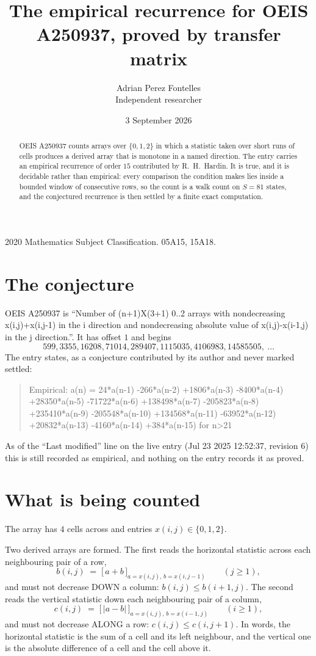 \documentclass[11pt,a4paper]{article}
\title{The empirical recurrence for OEIS A250937, proved by transfer matrix}
\author{Adrian Perez Fontelles\\ \small Independent researcher}
\date{3 September 2026}
\theoremstyle{plain}
\theoremstyle{definition}
\begin{document}
\maketitle

\begin{abstract}
OEIS A250937 counts arrays over $\{0,1,2\}$ in which a statistic taken over short runs
of cells produces a derived array that is monotone in a named direction. The entry carries an
empirical recurrence of order $15$ contributed by R.~H.~Hardin. It is true, and it is
decidable rather than empirical: every comparison the condition makes lies inside a bounded
window of consecutive rows, so the count is a walk count on $S=81$ states, and the
conjectured recurrence is then settled by a finite exact computation.
\end{abstract}

\noindent\small 2020 Mathematics Subject Classification. 05A15, 15A18.\normalsize

\section{The conjecture}

OEIS A250937 is ``Number of (n+1)X(3+1) 0..2 arrays with nondecreasing x(i,j)+x(i,j-1) in the i direction and nondecreasing absolute value of x(i,j)-x(i-1,j) in the j direction.''. It has offset $1$ and begins
\[
599, 3355, 16208, 71014, 289407, 1115035, 4106983, 14585505,\ \dots
\]
The entry states, as a conjecture contributed by its author and never marked settled:
\begin{quote}
Empirical: a(n) = 24*a(n-1) -266*a(n-2) +1806*a(n-3) -8400*a(n-4) +28350*a(n-5) -71722*a(n-6) +138498*a(n-7) -205823*a(n-8) +235410*a(n-9) -205548*a(n-10) +134568*a(n-11) -63952*a(n-12) +20832*a(n-13) -4160*a(n-14) +384*a(n-15) for n>21
\end{quote}
As of the ``Last modified'' line on the live entry (Jul 23 2025 12:52:37, revision 6) this is still
recorded as empirical, and nothing on the entry records it as proved.

\section{What is being counted}

The array has $4$ cells across and entries $x(i,j)\in\{0,1,2\}$.

Two derived arrays are formed. The first reads the horizontal statistic across each
neighbouring pair of a row,
\[
b(i,j)\;=\;\bigl[\,a+b\,\bigr]_{a=x(i,j),\,b=x(i,j-1)}\qquad (j\ge1),
\]
and must not decrease DOWN a column: $b(i,j)\le b(i{+}1,j)$. The second reads the vertical
statistic down each neighbouring pair of a column,
\[
c(i,j)\;=\;\bigl[\,\lvert a-b\rvert\,\bigr]_{a=x(i,j),\,b=x(i{-}1,j)}\qquad (i\ge1),
\]
and must not decrease ALONG a row: $c(i,j)\le c(i,j{+}1)$. In words, the horizontal statistic
is the sum of a cell and its left neighbour, and the vertical one is
the absolute difference of a cell and the cell above it.
\end{document}
